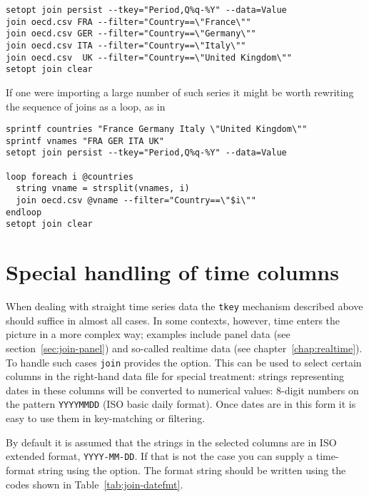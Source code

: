 \begin{footnotesize}
\begin{verbatim}
setopt join persist --tkey="Period,Q%q-%Y" --data=Value
join oecd.csv FRA --filter="Country==\"France\""
join oecd.csv GER --filter="Country==\"Germany\""
join oecd.csv ITA --filter="Country==\"Italy\""
join oecd.csv  UK --filter="Country==\"United Kingdom\""
setopt join clear
\end{verbatim}
\end{footnotesize}

If one were importing a large number of such series it might be worth
rewriting the sequence of joins as a loop, as in

\begin{footnotesize}
\begin{verbatim}
sprintf countries "France Germany Italy \"United Kingdom\""
sprintf vnames "FRA GER ITA UK"
setopt join persist --tkey="Period,Q%q-%Y" --data=Value

loop foreach i @countries
  string vname = strsplit(vnames, i)
  join oecd.csv @vname --filter="Country==\"$i\""
endloop
setopt join clear
\end{verbatim}
\end{footnotesize}

\section{Special handling of time columns}
\label{sec:join-tconvert}

When dealing with straight time series data the \texttt{tkey}
mechanism described above should suffice in almost all cases. In some
contexts, however, time enters the picture in a more complex way;
examples include panel data (see section~\ref{sec:join-panel}) and
so-called realtime data (see chapter~\ref{chap:realtime}). To handle
such cases \texttt{join} provides the  option. This
can be used to select certain columns in the right-hand data file for
special treatment: strings representing dates in these columns will be
converted to numerical values: 8-digit numbers on the pattern
\texttt{YYYYMMDD} (ISO basic daily format).  Once dates are in this
form it is easy to use them in key-matching or filtering.

By default it is assumed that the strings in the selected columns are
in ISO extended format, \texttt{YYYY-MM-DD}. If that is not
the case you can supply a time-format string using the
 option. The format string should be written using
the codes shown in Table~\ref{tab:join-datefmt}.


